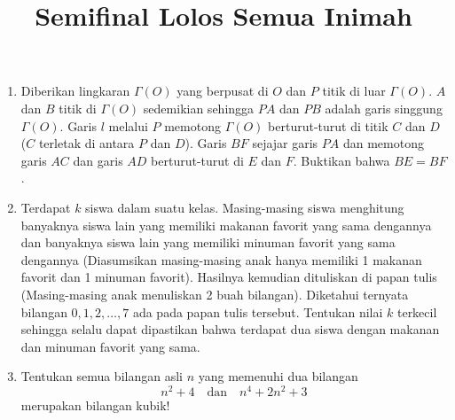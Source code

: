 \documentclass[12pt]{article}
\begin{document}
\title{Semifinal Lolos Semua Inimah}
\maketitle
\begin{enumerate}
    \item Diberikan lingkaran $\Gamma(O)$ yang berpusat di $O$ dan $P$ titik di luar $\Gamma(O)$. $A$ dan $B$ titik di $\Gamma(O)$ sedemikian sehingga $PA$ dan $PB$ adalah garis singgung $\Gamma(O)$. Garis $l$ melalui $P$ memotong $\Gamma(O)$ berturut-turut di titik $C$ dan $D$ ($C$ terletak di antara $P$ dan $D$). Garis $BF$ sejajar garis $PA$ dan memotong garis $AC$ dan garis $AD$ berturut-turut di $E$ dan $F$. Buktikan bahwa $BE = BF$.

    \item Terdapat $k$ siswa dalam suatu kelas. Masing-masing siswa menghitung banyaknya siswa lain yang memiliki makanan favorit yang sama dengannya dan banyaknya siswa lain yang memiliki minuman favorit yang sama dengannya (Diasumsikan masing-masing anak hanya memiliki 1 makanan favorit dan 1 minuman favorit). Hasilnya kemudian dituliskan di papan tulis (Masing-masing anak menuliskan 2 buah bilangan). Diketahui ternyata bilangan $0, 1, 2, \dots , 7$ ada pada papan tulis tersebut. Tentukan nilai $k$ terkecil sehingga selalu dapat dipastikan bahwa terdapat dua siswa dengan makanan dan minuman favorit yang sama.

    \item Tentukan semua bilangan asli $n$ yang memenuhi dua bilangan 
    \[ n^2+4 \quad \text{dan} \quad n^4+2n^2+3 \]
    merupakan bilangan kubik!
\end{enumerate}
\end{document}
